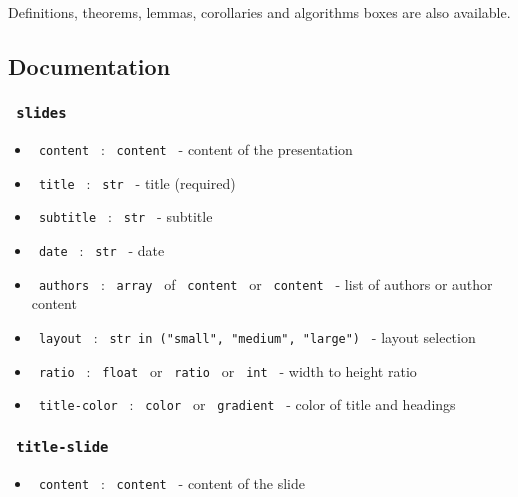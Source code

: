 Definitions, theorems, lemmas, corollaries and algorithms boxes are also
available.

\begin{Shaded}
\begin{Highlighting}[]
\NormalTok{\#definition(title: "An interesting definition")[}
\NormalTok{]}
\end{Highlighting}
\end{Shaded}

\subsection{Documentation}\label{documentation}

\subsubsection{\texorpdfstring{\texttt{\ slides\ }}{ slides }}\label{slides}

\begin{itemize}
\tightlist
\item
  \texttt{\ content\ } : \texttt{\ content\ } - content of the
  presentation
\item
  \texttt{\ title\ } : \texttt{\ str\ } - title (required)
\item
  \texttt{\ subtitle\ } : \texttt{\ str\ } - subtitle
\item
  \texttt{\ date\ } : \texttt{\ str\ } - date
\item
  \texttt{\ authors\ } : \texttt{\ array\ } of \texttt{\ content\ } or
  \texttt{\ content\ } - list of authors or author content
\item
  \texttt{\ layout\ } :
  \texttt{\ str\ in\ ("small",\ "medium",\ "large")\ } - layout
  selection
\item
  \texttt{\ ratio\ } : \texttt{\ float\ } or \texttt{\ ratio\ } or
  \texttt{\ int\ } - width to height ratio
\item
  \texttt{\ title-color\ } : \texttt{\ color\ } or \texttt{\ gradient\ }
  - color of title and headings
\end{itemize}

\subsubsection{\texorpdfstring{\texttt{\ title-slide\ }}{ title-slide }}\label{title-slide}

\begin{itemize}
\tightlist
\item
  \texttt{\ content\ } : \texttt{\ content\ } - content of the slide
\end{itemize}


